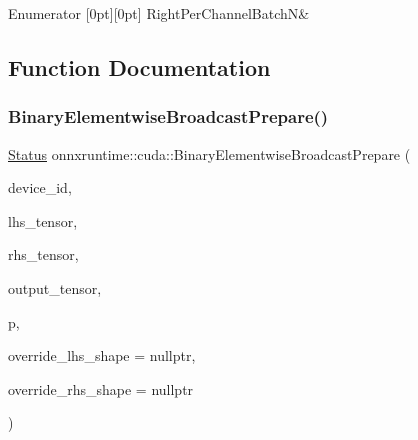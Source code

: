 \begin{DoxyEnumFields}{Enumerator}
[0pt][0pt]{}\mbox{\label{namespaceonnxruntime_1_1cuda_aa9f83573eddf1eee5577bb1c6aaae920ab907e3ea1ad58d2a08b02de5e8a27131}} 
Right\+Per\+Channel\+BatchN&\\
\hline

\end{DoxyEnumFields}


\subsection{Function Documentation}
\mbox{\label{namespaceonnxruntime_1_1cuda_abdb130419be4fca46b9b5a2f288e3f37}} 
\subsubsection{\texorpdfstring{Binary\+Elementwise\+Broadcast\+Prepare()}{BinaryElementwiseBroadcastPrepare()}}
{\footnotesize\ttfamily \mbox{\hyperlink{classonnxruntime_1_1common_1_1Status}{Status}} onnxruntime\+::cuda\+::\+Binary\+Elementwise\+Broadcast\+Prepare (\begin{DoxyParamCaption}\item[{int}]{device\+\_\+id,  }\item[{const \mbox{\hyperlink{classonnxruntime_1_1Tensor}{Tensor}} $\ast$}]{lhs\+\_\+tensor,  }\item[{const \mbox{\hyperlink{classonnxruntime_1_1Tensor}{Tensor}} $\ast$}]{rhs\+\_\+tensor,  }\item[{\mbox{\hyperlink{classonnxruntime_1_1Tensor}{Tensor}} $\ast$}]{output\+\_\+tensor,  }\item[{\mbox{\hyperlink{structonnxruntime_1_1cuda_1_1BinaryElementwisePreparation}{Binary\+Elementwise\+Preparation}} $\ast$}]{p,  }\item[{const \mbox{\hyperlink{classonnxruntime_1_1TensorShape}{Tensor\+Shape}} $\ast$}]{override\+\_\+lhs\+\_\+shape = {\ttfamily nullptr},  }\item[{const \mbox{\hyperlink{classonnxruntime_1_1TensorShape}{Tensor\+Shape}} $\ast$}]{override\+\_\+rhs\+\_\+shape = {\ttfamily nullptr} }\end{DoxyParamCaption})}

